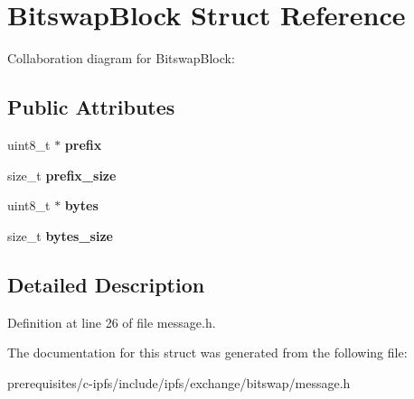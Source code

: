 \hypertarget{struct_bitswap_block}{}\section{Bitswap\+Block Struct Reference}
\label{struct_bitswap_block}


Collaboration diagram for Bitswap\+Block\+:
\subsection*{Public Attributes}
\begin{DoxyCompactItemize}
\item 
\mbox{\label{struct_bitswap_block_aa3190eb57e1a3b2efb4fc8d196d47f8e}} 
uint8\+\_\+t $\ast$ {\bfseries prefix}
\item 
\mbox{\label{struct_bitswap_block_a26981ef2865e326db4f64a3bfb818107}} 
size\+\_\+t {\bfseries prefix\+\_\+size}
\item 
\mbox{\label{struct_bitswap_block_a1136d727866dfeb61f2571d66eb4900d}} 
uint8\+\_\+t $\ast$ {\bfseries bytes}
\item 
\mbox{\label{struct_bitswap_block_a88da6ab013f5752f50ee9befc642befe}} 
size\+\_\+t {\bfseries bytes\+\_\+size}
\end{DoxyCompactItemize}


\subsection{Detailed Description}


Definition at line 26 of file message.\+h.



The documentation for this struct was generated from the following file\+:\begin{DoxyCompactItemize}
\item 
prerequisites/c-\/ipfs/include/ipfs/exchange/bitswap/message.\+h\end{DoxyCompactItemize}
